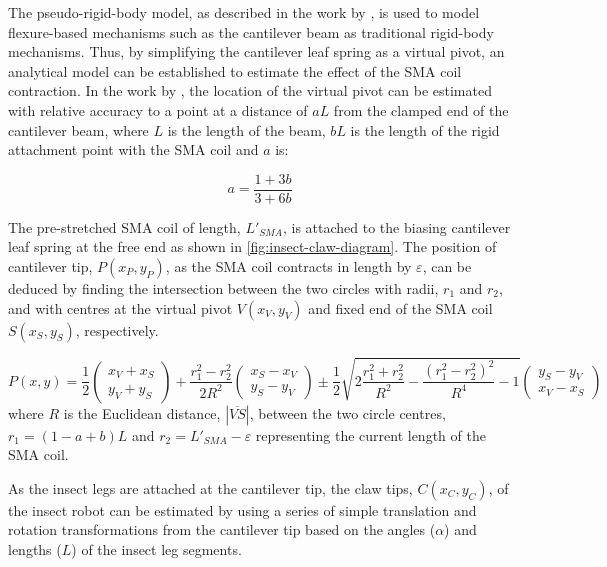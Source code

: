 The pseudo-rigid-body model, as described in the work by \cite{howellHandbookCompliantMechanisms2013}, is used to model flexure-based mechanisms such as the cantilever beam as traditional rigid-body mechanisms. Thus, by simplifying the cantilever leaf spring as a virtual pivot, an analytical model can be established to estimate the effect of the SMA coil contraction. In the work by \cite{zhangRealPivotStructure2007}, the location of the virtual pivot can be estimated with relative accuracy to a point at a distance of $aL$ from the clamped end of the cantilever beam, where $L$ is the length of the beam, $bL$ is the length of the rigid attachment point with the SMA coil and $a$ is:

\begin{equation}\label{eq:virtual-pivot-a}
a = \frac{1+3b}{3+6b}
\end{equation}

The pre-stretched SMA coil of length, $L'_{SMA}$, is attached to the biasing cantilever leaf spring at the free end as shown in \cref{fig:insect-claw-diagram}. The position of cantilever tip, $P(x_P,y_P)$, as the SMA coil contracts in length by $\varepsilon$, can be deduced by finding the intersection between the two circles with radii, $r_1$ and $r_2$, and with centres at the virtual pivot $V(x_V,y_V)$ and fixed end of the SMA coil $S(x_S,y_S)$, respectively.

\begin{equation}\label{eq:cc-intersect}
  P(x,y) = \frac{1}{2}\begin{pmatrix} x_V+x_S \\ y_V+y_S \end{pmatrix}+\frac{r_1^2-r_2^2}{2R^2}\begin{pmatrix} x_S-x_V \\ y_S-y_V\end{pmatrix}\pm\frac{1}{2}\sqrt{2\frac{r_1^2+r_2^2}{R^2}-\frac{(r_1^2-r_2^2)^2}{R^4}-1}\begin{pmatrix} y_S-y_V \\ x_V-x_S\end{pmatrix}
\end{equation}
where $R$ is the Euclidean distance, $|\overline{VS}|$, between the two circle centres, $r_1 = (1-a+b)L$ and $r_2 = L'_{SMA}-\varepsilon$ representing the current length of the SMA coil.

As the insect legs are attached at the cantilever tip, the claw tips, $C(x_C,y_C)$, of the insect robot can be estimated by using a series of simple translation and rotation transformations from the cantilever tip based on the angles ($\alpha$) and lengths ($L$) of the insect leg segments.

